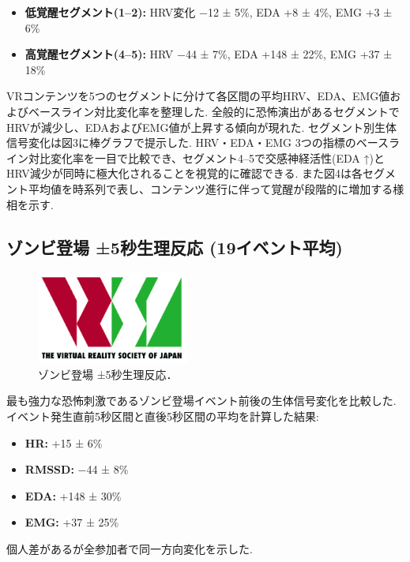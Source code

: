 \documentclass[a4paper]{jarticle}
\begin{document}
\begin{itemize}
\item \textbf{低覚醒セグメント(1–2):} HRV変化 −12 ± 5\%, EDA +8 ± 4\%, EMG +3 ± 6\%
\item \textbf{高覚醒セグメント(4–5):} HRV −44 ± 7\%, EDA +148 ± 22\%, EMG +37 ± 18\%
\end{itemize}

VRコンテンツを5つのセグメントに分けて各区間の平均HRV、EDA、EMG値およびベースライン対比変化率を整理した. 全般的に恐怖演出があるセグメントでHRVが減少し、EDAおよびEMG値が上昇する傾向が現れた. セグメント別生体信号変化は図3に棒グラフで提示した. HRV・EDA・EMG 3つの指標のベースライン対比変化率を一目で比較でき、セグメント4–5で交感神経活性(EDA ↑)とHRV減少が同時に極大化されることを視覚的に確認できる. また図4は各セグメント平均値を時系列で表し、コンテンツ進行に伴って覚醒が段階的に増加する様相を示す.

\subsection{ゾンビ登場 ±5秒生理反応 (19イベント平均)}

\begin{figure}[tb]
  \begin{center}
    \includegraphics*[width=50mm]{logo.png}
  \end{center}
  \vspace*{-6mm}
  \caption{ゾンビ登場 ±5秒生理反応．}
  \label{figure}
\end{figure}


最も強力な恐怖刺激であるゾンビ登場イベント前後の生体信号変化を比較した.イベント発生直前5秒区間と直後5秒区間の平均を計算した結果:

\begin{itemize}
\item \textbf{HR:} +15 ± 6\%
\item \textbf{RMSSD:} −44 ± 8\%
\item \textbf{EDA:} +148 ± 30\%
\item \textbf{EMG:} +37 ± 25\%
\end{itemize}

個人差があるが全参加者で同一方向変化を示した.
\end{document}
